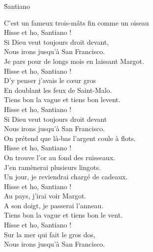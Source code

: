 \documentclass{novel}
\begin{document}
{\begin{minipage}[t][0.55\textheight][t]{\textwidth}
\vspace{0.00\textheight}
\h*{Santiano}
\begin{multicols}{2}
C’est un fameux trois-mâts fin comme un oiseau \\
Hisse et ho, Santiano ! \\
Si Dieu veut toujours droit devant, \\
Nous irons jusqu'à San Francisco. \\

Je pars pour de longs mois en laissant Margot. \\
Hisse et ho, Santiano ! \\
D'y penser j'avais le cœur gros \\
En doublant les feux de Saint-Malo. \\

Tiens bon la vague et tiens bon levent. \\
Hisse et ho, Santiano ! \\
Si Dieu veut toujours droit devant \\
Nous irons jusqu’à San Francisco. \\

On prétend que là-bas l'argent coule à flots. \\
Hisse et ho, Santiano ! \\
On trouve l'or au fond des ruisseaux. \\
J'en ramènerai plusieurs lingots. \\

Un jour, je reviendrai chargé de cadeaux. \\
Hisse et ho, Santiano ! \\
Au pays, j'irai voir Margot. \\
A son doigt, je passerai l'anneau. \\

Tiens bon la vague et tiens bon le vent. \\
Hisse et ho, Santiano ! \\
Sur la mer qui fait le gros dos, \\
Nous irons jusqu'à San Francisco.
\end{multicols}
\end{minipage}
}
\end{document}
